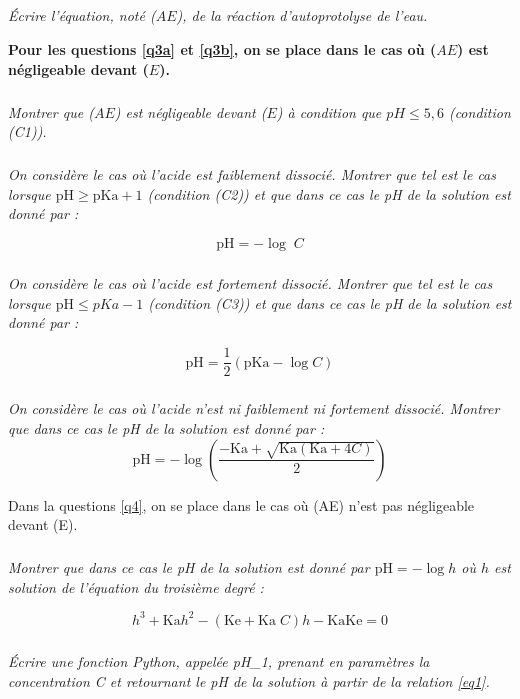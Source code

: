 \documentclass[10pt,oneside]{article}
\begin{document}
\subparagraph{\label{q2}}
\textit{Écrire l’équation, noté ($AE$), de la réaction d’autoprotolyse de l’eau.}

\vspace{.5cm}

\textbf{Pour les questions \ref{q3a} et \ref{q3b}, on se place dans le cas où ($AE$) est négligeable devant ($E$).}

\subparagraph{\label{q3a}}
\textit{Montrer que ($AE$) est négligeable devant ($E$) à condition que $pH \leq 5,6$ (condition (C1)).}

\subparagraph{\label{q3b}}
\textit{On considère le cas où l’acide est faiblement dissocié. Montrer que tel est le cas lorsque 
$\text{pH} \geq \text{pKa} +1$ (condition (C2)) et que dans ce cas le pH de la solution est donné par : }

\begin{equation} \label{eq1}
\text{pH}= -\log\; C 
\end{equation}


\subparagraph{\label{q3c}}
\textit{On considère le cas où l’acide est fortement dissocié. Montrer que tel est le cas lorsque 
$\text{pH} \leq pKa -1$ (condition (C3)) et que dans ce cas le pH de la solution est donné par : }

\begin{equation} \label{eq2}
\text{pH} = \dfrac{1}{2} \left(\text{pKa}- \log C \right)
\end{equation}

\subparagraph{\label{q3d}}
\textit{On considère le cas où l’acide n’est ni faiblement ni fortement dissocié. Montrer que dans ce cas 
le pH de la solution est donné par :}
\begin{equation} \label{eq3}
\text{pH} = - \log \left( \dfrac{-\text{Ka} + \sqrt{\text{Ka}\left( \text{Ka} + 4C\right)}}{2}\right)
\end{equation}


Dans la questions \ref{q4},
 on se place dans le cas où (AE) n’est pas négligeable devant (E). 
\subparagraph{\label{q4}}
\textit{Montrer que dans ce cas le pH de la solution est donné par $\text{pH} = - \log h$ où $h$ est solution de l’équation 
du troisième degré :}

\begin{equation} \label{eq4}
h^3 + \text{Ka}h^2 - \left(\text{Ke} + \text{Ka}\; C\right)h - \text{Ka} \text{Ke} = 0
\end{equation}


\subparagraph{\label{q5a}}
\textit{ Écrire une fonction Python, appelée pH\_1, prenant en paramètres la concentration C et retournant 
le pH de la solution à partir de la relation \eqref{eq1}. }
\end{document}
